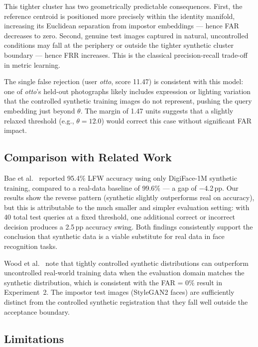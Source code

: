 \documentclass[conference]{IEEEtran}
\begin{document}
This tighter cluster has two geometrically predictable consequences. First, the reference centroid is positioned more precisely within the identity manifold, increasing its Euclidean separation from impostor embeddings — hence FAR decreases to zero. Second, genuine test images captured in natural, uncontrolled conditions may fall at the periphery or outside the tighter synthetic cluster boundary — hence FRR increases. This is the classical precision-recall trade-off in metric learning.

The single false rejection (user \textit{otto}, score 11.47) is consistent with this model: one of \textit{otto}'s held-out photographs likely includes expression or lighting variation that the controlled synthetic training images do not represent, pushing the query embedding just beyond $\theta$. The margin of 1.47 units suggests that a slightly relaxed threshold (e.g., $\theta\!=\!12.0$) would correct this case without significant FAR impact.

\subsection{Comparison with Related Work}

Bae et al.~\cite{bae2023digiface} reported 95.4\% LFW accuracy using only DigiFace-1M synthetic training, compared to a real-data baseline of 99.6\% — a gap of $-$4.2\,pp. Our results show the reverse pattern (synthetic slightly outperforms real on accuracy), but this is attributable to the much smaller and simpler evaluation setting: with 40 total test queries at a fixed threshold, one additional correct or incorrect decision produces a 2.5\,pp accuracy swing. Both findings consistently support the conclusion that synthetic data is a viable substitute for real data in face recognition tasks.

Wood et al.~\cite{wood2021fake} note that tightly controlled synthetic distributions can outperform uncontrolled real-world training data when the evaluation domain matches the synthetic distribution, which is consistent with the FAR = 0\% result in Experiment~2. The impostor test images (StyleGAN2 faces) are sufficiently distinct from the controlled synthetic registration that they fall well outside the acceptance boundary.

\subsection{Limitations}
\end{document}
